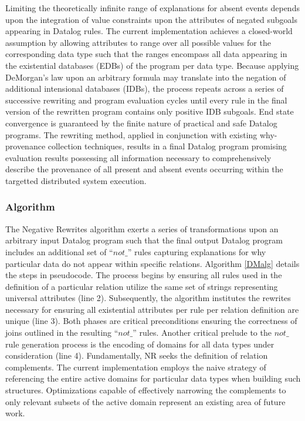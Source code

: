 Limiting the theoretically infinite range of explanations for absent events depends upon the integration of value constraints upon the attributes of negated subgoals appearing in Datalog rules. The current implementation achieves a closed-world assumption by allowing attributes to range over all possible values for the corresponding data type such that the ranges encompass all data appearing in the existential databases (EDBs) of the program per data type. Because applying DeMorgan's law upon an arbitrary formula may translate into the negation of additional intensional databases (IDBs), the process repeats across a series of successive rewriting and program evaluation cycles until every rule in the final version of the rewritten program contains only positive IDB subgoals. End state convergence is guaranteed by the finite nature of practical and safe Datalog programs. The rewriting method, applied in conjunction with existing why-provenance collection techniques, results in a final Datalog program promising evaluation results possessing all information necessary to comprehensively describe the provenance of all present and absent events occurring within the targetted distributed system execution.

\subsubsection{Algorithm}
The Negative Rewrites algorithm exerts a series of transformations upon an arbitrary input Datalog program such that the final output Datalog program includes an additional set of ``$not\_$'' rules capturing explanations for why particular data do not appear within specific relations. Algorithm \ref{DMalg} details the steps in pseudocode. The process begins by ensuring all rules used in the definition of a particular relation utilize the same set of strings representing universal attributes (line 2). Subsequently, the algorithm institutes the rewrites necessary for ensuring all existential attributes per rule per relation definition are unique (line 3). Both phases are critical preconditions ensuring the correctness of joins outlined in the resulting ``$not\_$'' rules. Another critical prelude to the $not\_$ rule generation process is the encoding of domains for all data types under consideration (line 4). Fundamentally, NR seeks the definition of relation complements. The current implementation employs the naive strategy of referencing the entire active domains for particular data types when building such structures. Optimizations capable of effectively narrowing the complements to only relevant subsets of the active domain represent an existing area of future work.

